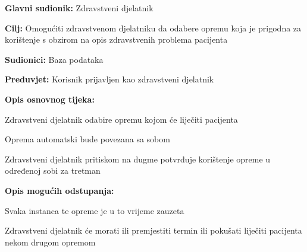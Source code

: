 \noindent {}
\begin{packed_item}
	
	\item \textbf{Glavni sudionik: }Zdravstveni djelatnik
	\item  \textbf{Cilj:} Omogućiti zdravstvenom djelatniku da odabere opremu koja je prigodna za korištenje s obzirom na opis zdravstvenih problema pacijenta
	\item  \textbf{Sudionici:} Baza podataka
	\item  \textbf{Preduvjet:} Korisnik prijavljen kao zdravstveni djelatnik
	\item  \textbf{Opis osnovnog tijeka:}
	
	\item[] \begin{packed_enum}
		
		\item Zdravstveni djelatnik odabire opremu kojom će liječiti pacijenta
		\item Oprema automatski bude povezana sa sobom 
		\item Zdravstveni djelatnik pritiskom na dugme potvrđuje korištenje opreme u određenoj sobi za tretman
	\end{packed_enum}
	
	\item  \textbf{Opis mogućih odstupanja:}
	
	\item[] \begin{packed_item}
		
		\item[1.a] Svaka instanca te opreme je u to vrijeme zauzeta
		\item[] \begin{packed_enum}
			
			\item Zdravstveni djelatnik će morati ili premjestiti termin ili pokušati liječiti pacijenta nekom drugom opremom
			
		\end{packed_enum}
	
	\end{packed_item}
\end{packed_item}


